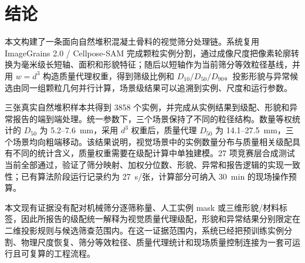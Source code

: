 \clearpage
\section{结论}
\label{sec:r-conclusion}

本文构建了一条面向自然堆积混凝土骨料的视觉筛分处理链。系统复用 ImageGrains 2.0 / Cellpose-SAM 完成颗粒实例分割，通过成像尺度把像素轮廓转换为毫米级长短轴、面积和形貌特征；随后以短轴作为当前筛分等效粒径基线，并用 $w=d^3$ 构造质量代理权重，得到筛级比例和 $D_{10}/D_{50}/D_{90}$。投影形貌与异常候选由同一组颗粒几何并行计算，场景级结果可以追溯到实例、尺度和运行参数。

三张真实自然堆积样本共得到 3858 个实例，并完成从实例结果到级配、形貌和异常报告的端到端处理。统一参数下，三个场景保持了不同的粒径结构。数量等权统计的 $D_{50}$ 为 5.2--7.6~mm，采用 $d^3$ 权重后，质量代理 $D_{50}$ 为 14.1--27.5~mm，三个场景均向粗端移动。该结果说明，视觉场景中的实例数量分布与质量相关级配具有不同的统计含义，质量权重需要在级配计算中单独建模。27 项竞赛层合成测试当前全部通过，验证了筛分映射、加权分位数、形貌、异常和报告逻辑的实现一致性；已有算法阶段运行记录约为 27~s/张，计算部分可纳入 30~min 的现场操作预算。

本文现有证据没有配对机械筛分逐筛称量、人工实例 mask 或三维形貌/材料标签，因此所报告的级配统一解释为视觉质量代理级配，形貌和异常结果分别限定在二维投影规则与候选筛查范围内。在这一证据范围内，系统已经把预训练实例分割、物理尺度恢复、筛分等效粒径、质量代理统计和现场质量控制连接为一套可运行且可复算的工程流程。
